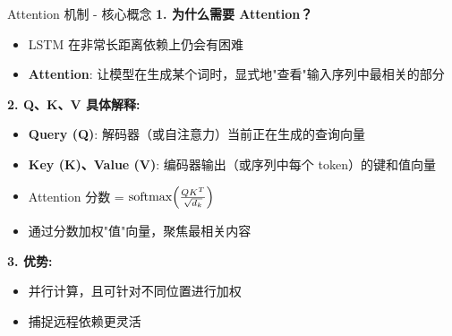\documentclass{beamer}
\begin{document}
\begin{frame}{Attention 机制 - 核心概念}
  \textbf{1. 为什么需要 Attention？}
  \begin{itemize}
    \item LSTM 在非常长距离依赖上仍会有困难
    \item \textbf{Attention}: 让模型在生成某个词时，显式地"查看"输入序列中最相关的部分
  \end{itemize}
  \vspace{1em}
  \textbf{2. Q、K、V 具体解释:}
  \begin{itemize}
    \item \textbf{Query (Q)}: 解码器（或自注意力）当前正在生成的查询向量
    \item \textbf{Key (K)、Value (V)}: 编码器输出（或序列中每个 token）的键和值向量
    \item Attention 分数 = $\text{softmax}\Bigl(\frac{Q K^T}{\sqrt{d_k}}\Bigr)$
    \item 通过分数加权"值"向量，聚焦最相关内容
  \end{itemize}
  \vspace{1em}
  \textbf{3. 优势:}
  \begin{itemize}
    \item 并行计算，且可针对不同位置进行加权
    \item 捕捉远程依赖更灵活
  \end{itemize}
\end{frame}
\end{document}
